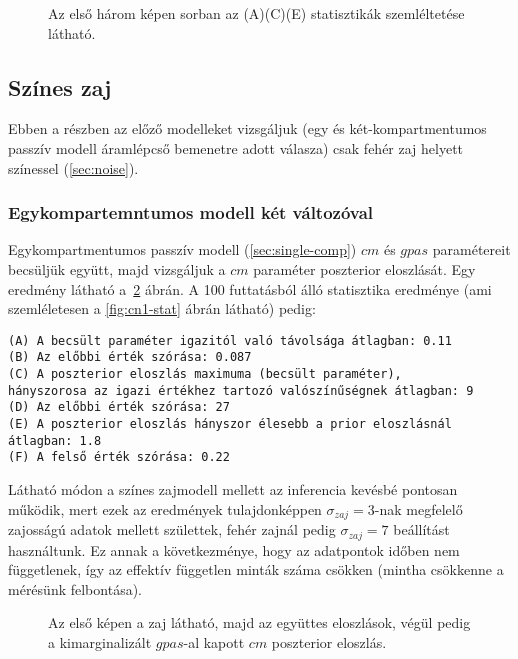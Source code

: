 \begin{figure}
	\hfill
	\hfill
	\hfill
	\vfill
	\caption[Kétkompartmentumos, fehér zaj, két paraméter statisztika]{Az első három képen sorban az (A)(C)(E) statisztikák szemléltetése látható.}%
	\label{fig:wn3-stat}
\end{figure}

\FloatBarrier
\subsection{Színes zaj}
Ebben a részben az előző modelleket vizsgáljuk (egy és két-kompartmentumos passzív modell áramlépcső bemenetre adott válasza) csak fehér zaj helyett színessel (\ref{sec:noise}).
\subsubsection{Egykompartemntumos modell két változóval}
Egykompartmentumos passzív modell (\ref{sec:single-comp}) $cm$ és $gpas$ paramétereit becsüljük együtt, majd vizsgáljuk a $cm$ paraméter poszterior eloszlását. Egy eredmény látható a~\ref{fig:cn1} ábrán. A 100 futtatásból álló statisztika eredménye (ami szemléletesen a \ref{fig:cn1-stat} ábrán látható) pedig:

\begin{verbatim}
(A) A becsült paraméter igazitól való távolsága átlagban: 0.11
(B) Az előbbi érték szórása: 0.087
(C) A poszterior eloszlás maximuma (becsült paraméter), 
hányszorosa az igazi értékhez tartozó valószínűségnek átlagban: 9
(D) Az előbbi érték szórása: 27
(E) A poszterior eloszlás hányszor élesebb a prior eloszlásnál átlagban: 1.8
(F) A felső érték szórása: 0.22
\end{verbatim}

Látható módon a színes zajmodell mellett az inferencia kevésbé pontosan működik, mert ezek az eredmények tulajdonképpen $\sigma_{zaj} = 3$-nak megfelelő zajosságú adatok mellett születtek, fehér zajnál pedig $\sigma_{zaj} = 7$ beállítást használtunk. 
Ez annak a következménye, hogy az adatpontok időben nem függetlenek, így az effektív független minták száma csökken (mintha csökkenne a mérésünk felbontása).

\begin{figure}
	\hfill
	\hfill
	\hfill
	\vfill
	\hfill
	\caption[Egykompartmentum, színes zaj, két paraméter inferencia]{Az első képen a zaj látható, majd az együttes eloszlások, végül pedig a kimarginalizált $gpas$-al kapott $cm$ poszterior eloszlás.}%
	\label{fig:cn1}
\end{figure}

